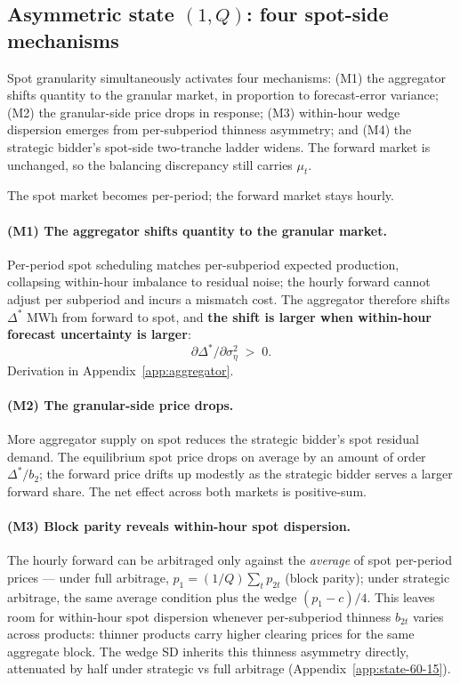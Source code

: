 \documentclass[11pt]{article}
\begin{document}
\subsection{Asymmetric state $(1,Q)$: four spot-side mechanisms}\label{sec:id15}

Spot granularity simultaneously activates four mechanisms: (M1) the aggregator shifts quantity to the granular market, in proportion to forecast-error variance; (M2) the granular-side price drops in response; (M3) within-hour wedge dispersion emerges from per-subperiod thinness asymmetry; and (M4) the strategic bidder's spot-side two-tranche ladder widens. The forward market is unchanged, so the balancing discrepancy still carries $\mu_t$.

The spot market becomes per-period; the forward market stays hourly.

\paragraph{(M1) The aggregator shifts quantity to the granular market.} Per-period spot scheduling matches per-subperiod expected production, collapsing within-hour imbalance to residual noise; the hourly forward cannot adjust per subperiod and incurs a mismatch cost. The aggregator therefore shifts $\Delta^*$ MWh from forward to spot, and \textbf{the shift is larger when within-hour forecast uncertainty is larger}:
\begin{equation}
\boxed{\;\partial \Delta^* / \partial \sigma_\eta^2 \;>\; 0.\;}
\label{eq:shift}
\end{equation}
Derivation in Appendix~\ref{app:aggregator}.

\paragraph{(M2) The granular-side price drops.} More aggregator supply on spot reduces the strategic bidder's spot residual demand. The equilibrium spot price drops on average by an amount of order $\Delta^*/b_2$; the forward price drifts up modestly as the strategic bidder serves a larger forward share. The net effect across both markets is positive-sum.

\paragraph{(M3) Block parity reveals within-hour spot dispersion.} The hourly forward can be arbitraged only against the \emph{average} of spot per-period prices --- under full arbitrage, $p_1 = (1/Q)\sum_t p_{2t}$ (block parity); under strategic arbitrage, the same average condition plus the \citeauthor{ito_reguant_2016} wedge $(p_1-c)/4$. This leaves room for within-hour spot dispersion whenever per-subperiod thinness $b_{2t}$ varies across products: thinner products carry higher clearing prices for the same aggregate block. The wedge SD inherits this thinness asymmetry directly, attenuated by half under strategic vs full arbitrage (Appendix~\ref{app:state-60-15}).
\end{document}
